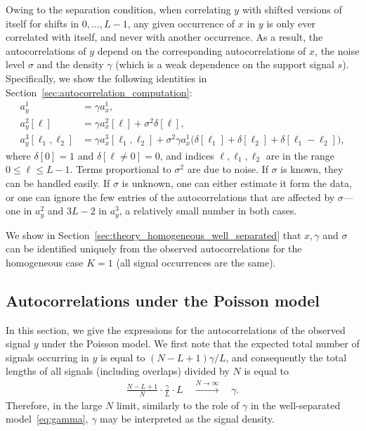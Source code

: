 \documentclass[12pt]{article}
\newcommand{\1}{\mathbf{1}}
\newcommand{\Poisson}{\text{Poisson}}
\newcommand{\TODO}[1]{{\color{red}{[#1]}}}
\theoremstyle{plain}
\theoremstyle{definition}
\theoremstyle{remark}
\theoremstyle{plain}
\theoremstyle{remark}
\theoremstyle{plain}
\theoremstyle{plain}
\theoremstyle{plain}
\numberwithin{equation}{section}
\begin{document}
Owing to the separation condition, when correlating $y$ with shifted versions of itself for shifts in $0, \ldots, L-1$, any given occurrence of $x$ in $y$ is only ever correlated with itself, and never with another occurrence. As a result, the autocorrelations of $y$ depend on the corresponding autocorrelations of $x$, the noise level $\sigma$ and the density $\gamma$ (which is a weak dependence on the support signal $s$). Specifically, we show the following identities in Section~\ref{sec:autocorrelation_computation}:
\begin{align} 
	a_y^1 & = \gamma a_{x}^1, \label{eq:mean_micrograph} \\
	a_y^2[\ell] & = \gamma a_{x}^2[\ell] + \sigma^2\delta[\ell], \label{eq:ac2_micrograph}\\
	a_y^3[\ell_1,\ell_2] & = \gamma a_{x}^3[\ell_1,\ell_2]  + \sigma^2\gamma a_{x}^1  \big(\delta[\ell_1]+\delta[\ell_2]
	+\delta[\ell_1-\ell_2]\big), \label{eq:ac3_micrograph}
\end{align}
where $\delta[0] = 1$ and $\delta[\ell \neq 0] = 0$, and indices $\ell, \ell_1, \ell_2$ are in the range $0 \leq \ell \leq L-1$. Terms proportional to $\sigma^2$ are due to noise. If $\sigma$ is known, they can be handled easily. If $\sigma$ is unknown, one can either estimate it form the data, or one can ignore the few entries of the autocorrelations that are affected by $\sigma$---one in $a_y^2$ and $3L-2$ in $a_y^3$, a relatively small number in both cases.


We show in Section~\ref{sec:theory_homogeneous_well_separated} 
that $x,\gamma$ and $\sigma$ can be identified uniquely from the observed autocorrelations for the homogeneous case $K = 1$ (all signal occurrences are the same). %

\subsection{Autocorrelations under the Poisson model} \label{sec:ac_poisson}

In this section, we give the expressions for the autocorrelations of the observed signal $y$ under the Poisson model. %
 We first note that the expected total number of signals occurring in $y$ is equal to $(N - L + 1)\gamma / L$, and consequently the total lengths of all signals (including overlaps) divided by $N$ is equal to
%
\begin{align}
\frac{N - L + 1}{N} \cdot \frac{\gamma  }{L}  \cdot L 
\quad \overset{N\to\infty}{\longrightarrow} \quad \gamma.
\end{align}
%
Therefore, in the large $N$ limit, similarly to the role of $\gamma$ in the well-separated model~\eqref{eq:gamma}, $\gamma$ may be interpreted as the signal density.
\end{document}
